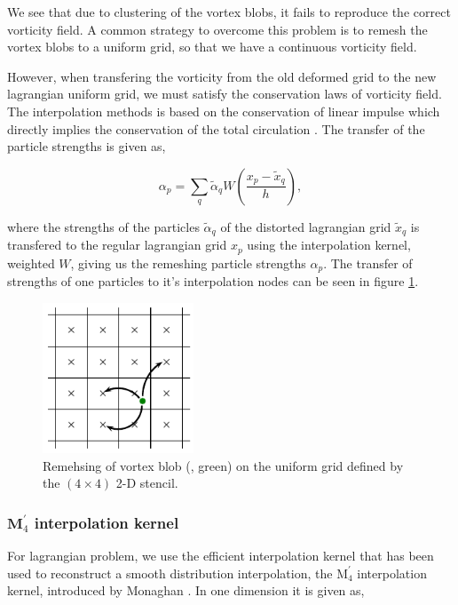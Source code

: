 We see that due to clustering of the vortex blobs, it fails to reproduce the correct vorticity field. A common strategy to overcome this problem is to remesh the vortex blobs to a uniform grid, so that we have a continuous vorticity field.

However, when transfering the vorticity from the old deformed grid to the new lagrangian uniform grid, we must satisfy the conservation laws of vorticity field. The interpolation methods is based on the conservation of linear impulse which directly implies the conservation of the total circulation \cite{Cottet2000a}. The transfer of the particle strengths is given as, 

	\begin{equation}
	\alpha_p = \sum_q\tilde{\alpha}_q W \left(\frac{x_p - \tilde{x}_q}{h}\right),	
	\end{equation}

where the strengths of the particles $\tilde{\alpha}_q$ of the distorted lagrangian grid $\tilde{x}_q$ is transfered to the regular lagrangian grid $x_p$ using the interpolation kernel, weighted $W$, giving us the remeshing particle strengths $\alpha_p$. The transfer of strengths of one particles to it's interpolation nodes can be seen in figure \ref{fig:interpolationGrid}.


	\begin{figure}[!b]
	\centering
	\includegraphics[width=0.4\textwidth]{figures/lagrangian/interpolationGrid.pdf}
	\caption{Remehsing of vortex blob ({\color{plotGreen}{$\bullet$}}, green) on the uniform grid defined by the $\left(4\times4\right)$ 2-D stencil.}
	\label{fig:interpolationGrid}
	\end{figure}

\subsubsection*{$\mathbf{M}^\prime_4$ interpolation kernel}
For lagrangian problem, we use the efficient interpolation kernel that has been used to reconstruct a smooth distribution interpolation, the $\mathrm{M}^{\prime}_4$ interpolation kernel, introduced by Monaghan \cite{Monaghan1985}. In one dimension it is given as,

